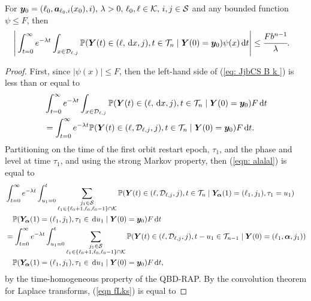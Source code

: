 \begin{cor}\label{vcor: cdks d}
	For \(\boldsymbol y_0=(\ell_0,\boldsymbol a_{\ell_0,i}(x_0),i),\, \lambda>0,\, \ell_0,\ell\in\mathcal K,\,i,j\in\mathcal S\) and any bounded function \(\psi\leq F\), then
	\begin{align}
		\Bigg|&\int_{t=0}^\infty e^{-\lambda t}\int_{x\in\mathcal{D}_{\ell,j}}\mathbb P({\boldsymbol Y}(t) \in (\ell,\, \mathrm{d} x, j), t\in\mathcal T_n \mid 
		\boldsymbol Y(0)=\boldsymbol y_0)
		\psi(x) \, \mathrm{d} t \Bigg|
		\leq \cfrac{F b^{n-1}}{\lambda}.\label{eq: JjbCS  B k }
	\end{align}
\end{cor}
\begin{proof}
	First, since \(|\psi(x)|\leq F\), then the left-hand side of (\ref{eq: JjbCS  B k }) is less than or equal to 
	\begin{align}
		&\int_{t=0}^\infty e^{-\lambda t}\int_{x\in\mathcal{D}_{\ell,j}}\mathbb P({\boldsymbol Y}(t) \in (\ell,\, \mathrm{d} x,j), t\in\mathcal T_n \mid  \nonumber 
		\boldsymbol Y(0)=\boldsymbol y_0)F\, \mathrm{d} t \nonumber
		\\&=\int_{t=0}^\infty e^{-\lambda t} \mathbb P( {\boldsymbol Y}(t) \in (\ell,\mathcal D_{\ell,j},j), t\in\mathcal T_n \mid \boldsymbol Y(0)=\boldsymbol y_0)F\, \mathrm{d} t. \label{eqn: alalal}
	\end{align}
	Partitioning on the time of the first orbit restart epoch, \(\tau_1\), and the phase and level at time \(\tau_1\), and using the strong Markov property, then (\ref{eqn: alalal}) is equal to 
	\begin{align}
		&\int_{t=0}^\infty e^{-\lambda t} \int_{u_1=0}^t \sum_{\substack{j_1\in\mathcal S\\\ell_1\in\{\ell_0+1,\ell_0,\ell_0-1\}\cap\mathcal K}}\mathbb P( {\boldsymbol Y}(t) \in (\ell,\mathcal D_{\ell,j},j), t\in\mathcal T_n \nonumber
		\mid \bm{Y}_{\bm{\alpha}}(1)=(\ell_1,j_1),  \tau_1=u_1)\nonumber
		\\&\quad\mathbb P(\bm{Y}_{\bm{\alpha}}(1)=(\ell_1,j_1), \tau_1\in \, \mathrm{d} u_1
		\mid \boldsymbol Y(0)=\boldsymbol y_0)F  \, \mathrm{d} t\nonumber
		\\&=\int_{t=0}^\infty e^{-\lambda t} \int_{u_1=0}^t \sum_{\substack{j_1\in\mathcal S\\\ell_1\in\{\ell_0+1,\ell_0,\ell_0-1\}\cap\mathcal K}}\mathbb P( {\boldsymbol Y}(t) \in (\ell,\mathcal D_{\ell,j},j), t-u_1\in\mathcal T_{n-1} \nonumber
		\mid 
		\boldsymbol Y(0)=(\ell_1,\boldsymbol \alpha,j_1))
		\\&\quad\mathbb P(\bm{Y}_{\bm{\alpha}}(1)=(\ell_1,j_1), \tau_1\in \, \mathrm{d} u_1
		\mid \boldsymbol Y(0)=\boldsymbol y_0)F  \, \mathrm{d} t, \label{eqn fLks}
	\end{align}
	by the time-homogeneous property of the QBD-RAP. By the convolution theorem for Laplace transforms, (\ref{eqn fLks}) is equal to 

\end{proof}
